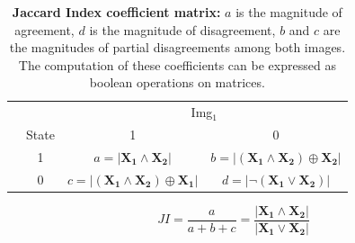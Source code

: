 			\begin{table}[ht]
				\centering
				\caption[Jaccard Index coefficient matrix]{\textbf{Jaccard Index coefficient matrix:} $a$ is the magnitude of agreement, $d$ is the magnitude of disagreement, $b$ and $c$ are the magnitudes of partial disagreements among both images. The computation of these coefficients can be expressed as boolean operations on matrices.}
				\label{tab:jaccard_matrix}
				\begin{tabular}{lccc}
					\hline
					& & \multicolumn{2}{c}{Img$_1$} \\
					& State & 1 & 0 \\\hline
					\multirow{2}{*}{\STAB{\rotatebox[origin=c]{90}{Img$_2$}}} & 1 & $a=|\mathbf{X_1} \land \mathbf{X_2}|$ & $b=|(\mathbf{X_1} \land \mathbf{X_2}) \oplus \mathbf{X_2}| $ \\ 
					& 0 & $c=|(\mathbf{X_1} \land \mathbf{X_2}) \oplus \mathbf{X_1}|$ & $d=|\neg ( \mathbf{X_1} \lor \mathbf{X_2})|$ \\\hline 
				\end{tabular}
			\end{table}
			\begin{equation}
			\label{eq:jaccard_index}
				JI = \frac{a}{a+b+c} = \frac{|\mathbf{X_1} \land \mathbf{X_2}|}{|\mathbf{X_1} \lor \mathbf{X_2}|}
			\end{equation}

